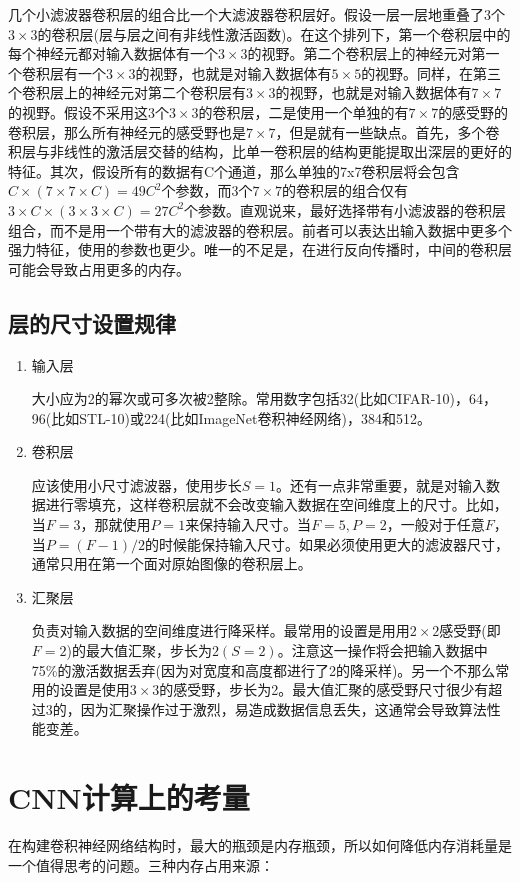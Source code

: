 \documentclass[UTF-8, a4paper, 12pt]{ctexart}
\begin{document}
几个小滤波器卷积层的组合比一个大滤波器卷积层好。假设一层一层地重叠了3个$3\times 3$的卷积层(层与层之间有非线性激活函数)。在这个排列下，第一个卷积层中的每个神经元都对输入数据体有一个$3\times 3$的视野。第二个卷积层上的神经元对第一个卷积层有一个$3\times 3$的视野，也就是对输入数据体有$5\times 5$的视野。同样，在第三个卷积层上的神经元对第二个卷积层有$3\times 3$的视野，也就是对输入数据体有$7\times 7$的视野。假设不采用这3个$3\times 3$的卷积层，二是使用一个单独的有$7\times 7$的感受野的卷积层，那么所有神经元的感受野也是$7\times 7$，但是就有一些缺点。首先，多个卷积层与非线性的激活层交替的结构，比单一卷积层的结构更能提取出深层的更好的特征。其次，假设所有的数据有C个通道，那么单独的7x7卷积层将会包含$C\times(7\times 7\times C)=49C^2$个参数，而3个$7\times 7$的卷积层的组合仅有$3\times C\times(3\times 3\times C)=27C^2$个参数。直观说来，最好选择带有小滤波器的卷积层组合，而不是用一个带有大的滤波器的卷积层。前者可以表达出输入数据中更多个强力特征，使用的参数也更少。唯一的不足是，在进行反向传播时，中间的卷积层可能会导致占用更多的内存。

\subsection{层的尺寸设置规律}
\begin{enumerate}
    \item 输入层
    
  大小应为2的幂次或可多次被2整除。常用数字包括32(比如CIFAR-10)，64，96(比如STL-10)或224(比如ImageNet卷积神经网络)，384和512。
  \item 卷积层
  
  应该使用小尺寸滤波器，使用步长$S=1$。还有一点非常重要，就是对输入数据进行零填充，这样卷积层就不会改变输入数据在空间维度上的尺寸。比如，当$F=3$，那就使用$P=1$来保持输入尺寸。当$F=5,P=2$，一般对于任意$F$，当$P=(F-1)/2$的时候能保持输入尺寸。如果必须使用更大的滤波器尺寸，通常只用在第一个面对原始图像的卷积层上。

  \item 汇聚层
  
  负责对输入数据的空间维度进行降采样。最常用的设置是用用$2\times 2$感受野(即$F=2$)的最大值汇聚，步长为$2(S=2)$。注意这一操作将会把输入数据中75\%的激活数据丢弃(因为对宽度和高度都进行了2的降采样)。另一个不那么常用的设置是使用$3\times 3$的感受野，步长为2。最大值汇聚的感受野尺寸很少有超过3的，因为汇聚操作过于激烈，易造成数据信息丢失，这通常会导致算法性能变差。
\end{enumerate}



\section{CNN计算上的考量}
在构建卷积神经网络结构时，最大的瓶颈是内存瓶颈，所以如何降低内存消耗量是一个值得思考的问题。三种内存占用来源：
\end{document}
